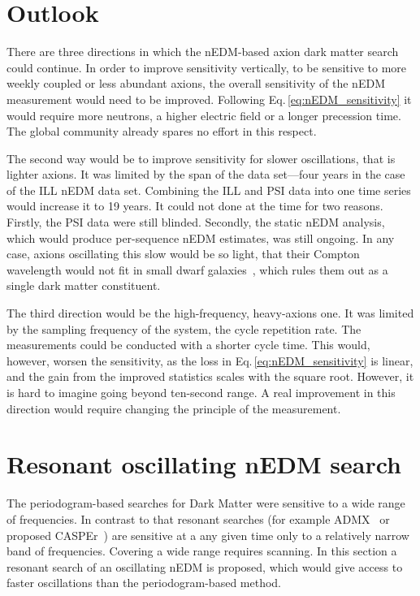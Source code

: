 \section{Outlook}
There are three directions in which the nEDM-based axion dark matter search could continue.
In order to improve sensitivity vertically, to be sensitive to more weekly coupled or less abundant axions, the overall sensitivity of the nEDM measurement would need to be improved. Following Eq.\,\ref{eq:nEDM_sensitivity} it would require more neutrons, a higher electric field or a longer precession time.
The global community already spares no effort in this respect.

The second way would be to improve sensitivity for slower oscillations, that is  lighter axions. It was limited by the span of the data set---four years in the case of the ILL nEDM data set. Combining the ILL and PSI data into one time series would increase it to 19 years. It could not done at the time for two reasons. Firstly, the PSI data were still blinded. Secondly, the static nEDM analysis, which would produce per-sequence nEDM estimates, was still ongoing. In any case, axions oscillating this slow would be so light, that their Compton wavelength would not fit in small dwarf galaxies~\cite{Marsh2015Review}, which rules them out as a single dark matter constituent.

The third direction would be the high-frequency, heavy-axions one. It was limited by the sampling frequency of the system, the cycle repetition rate.
The measurements could be conducted with a shorter cycle time. This would, however, worsen the sensitivity, as the loss in Eq.\,\ref{eq:nEDM_sensitivity} is linear, and the gain from the improved statistics scales with the square root.
However, it is hard to imagine going beyond ten-second range. A real improvement in this direction would require changing the principle of the measurement.




\section{Resonant oscillating nEDM search}
The periodogram-based searches for Dark Matter were sensitive to a wide range of frequencies. In contrast to that resonant searches (for example ADMX~\cite{PhysRevLett.104.041301} or proposed CASPEr~\cite{CASPEr2014}) are sensitive at a any given time only to a relatively narrow band of frequencies. Covering a wide range requires scanning. In this section a resonant search of an oscillating nEDM is proposed, which would give access to faster oscillations than the periodogram-based method.

